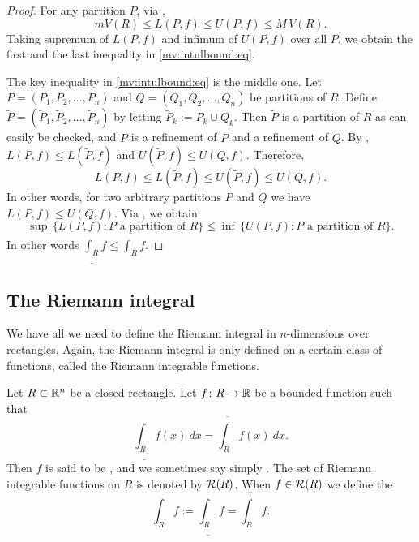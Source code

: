 \begin{proof}
For any partition $P$, via ,
\begin{equation*}
mV(R) \leq L(P,f) \leq U(P,f) \leq M\,V(R).
\end{equation*}
Taking supremum of $L(P,f)$ and infimum of $U(P,f)$ over all $P$,
we obtain the first and the last inequality in
\eqref{mv:intulbound:eq}.

The key inequality in
\eqref{mv:intulbound:eq}
is the middle one.
Let $P=(P_1,P_2,\ldots,P_n)$ and
$Q=(Q_1,Q_2,\ldots,Q_n)$
be partitions of $R$.  Define 
$\widetilde{P} = ( \widetilde{P}_1,\widetilde{P}_2,\ldots,\widetilde{P}_n )$
by letting
$\widetilde{P}_k := P_k \cup Q_k$.
Then $\widetilde{P}$ is a partition of $R$ as can easily be checked,
and $\widetilde{P}$ is a refinement of $P$ and a refinement of $Q$.
By ,
$L(P,f) \leq L(\widetilde{P},f)$ and
$U(\widetilde{P},f) \leq U(Q,f)$.  Therefore,
\begin{equation*}
L(P,f) \leq L(\widetilde{P},f) \leq U(\widetilde{P},f) \leq U(Q,f) .
\end{equation*}
In other words, for two arbitrary partitions $P$ and $Q$ we have
$L(P,f) \leq U(Q,f)$.  
Via , %
we obtain
\begin{equation*}
\sup \, \bigl\{ L(P,f) : \text{$P$ a partition of $R$} \bigl\}
\leq
\inf \, \bigl\{ U(P,f) : \text{$P$ a partition of $R$} \bigl\} .
\end{equation*}
In other words $\underline{\int_R} f \leq \overline{\int_R} f$.
\end{proof}

\subsection{The Riemann integral}

We have all we need to
define the Riemann integral in $n$-dimensions over rectangles.
Again, the Riemann
integral is only defined on a certain class of functions, called the
Riemann integrable functions.

\begin{defn}
Let $R \subset {\mathbb{R}}^n$ be a closed rectangle.
Let $f \colon R \to {\mathbb{R}}$ be a bounded function such that
\begin{equation*}
\underline{\int_R} f(x)~dx = \overline{\int_R} f(x)~dx .
\end{equation*}
Then $f$ is said to be \emph{},
and we sometimes say simply \emph{}.
The set of Riemann integrable functions on $R$ is denoted
by ${\mathcal{R}}(R)$.  When $f \in {\mathcal{R}}(R)$ we define
the \emph{}
\begin{equation*}
\int_R f := 
\underline{\int_R} f = \overline{\int_R} f .
\end{equation*}
\end{defn}

